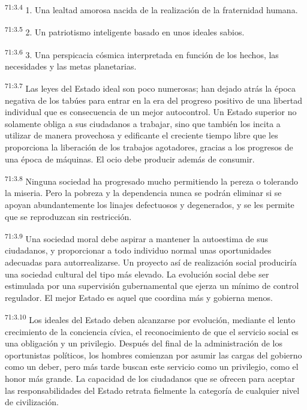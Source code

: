 \documentclass[twoside, 11pt]{book}
\begin{document}
\par
\textsuperscript{71:3.4} 1. Una lealtad amorosa nacida de la realización de la fraternidad humana.

\par
\textsuperscript{71:3.5} 2. Un patriotismo inteligente basado en unos ideales sabios.

\par
\textsuperscript{71:3.6} 3. Una perspicacia cósmica interpretada en función de los hechos, las necesidades y las metas planetarias.

\par
\textsuperscript{71:3.7} Las leyes del Estado ideal son poco numerosas; han dejado atrás la época negativa de los tabúes para entrar en la era del progreso positivo de una libertad individual que es consecuencia de un mejor autocontrol. Un Estado superior no solamente obliga a sus ciudadanos a trabajar, sino que también los incita a utilizar de manera provechosa y edificante el creciente tiempo libre que les proporciona la liberación de los trabajos agotadores, gracias a los progresos de una época de máquinas. El ocio debe producir además de consumir.

\par
\textsuperscript{71:3.8} Ninguna sociedad ha progresado mucho permitiendo la pereza o tolerando la miseria. Pero la pobreza y la dependencia nunca se podrán eliminar si se apoyan abundantemente los linajes defectuosos y degenerados, y se les permite que se reproduzcan sin restricción.

\par
\textsuperscript{71:3.9} Una sociedad moral debe aspirar a mantener la autoestima de sus ciudadanos, y proporcionar a todo individuo normal unas oportunidades adecuadas para autorrealizarse. Un proyecto así de realización social produciría una sociedad cultural del tipo más elevado. La evolución social debe ser estimulada por una supervisión gubernamental que ejerza un mínimo de control regulador. El mejor Estado es aquel que coordina más y gobierna menos.

\par
\textsuperscript{71:3.10} Los ideales del Estado deben alcanzarse por evolución, mediante el lento crecimiento de la conciencia cívica, el reconocimiento de que el servicio social es una obligación y un privilegio. Después del final de la administración de los oportunistas políticos, los hombres comienzan por asumir las cargas del gobierno como un deber, pero más tarde buscan este servicio como un privilegio, como el honor más grande. La capacidad de los ciudadanos que se ofrecen para aceptar las responsabilidades del Estado retrata fielmente la categoría de cualquier nivel de civilización.
\end{document}
